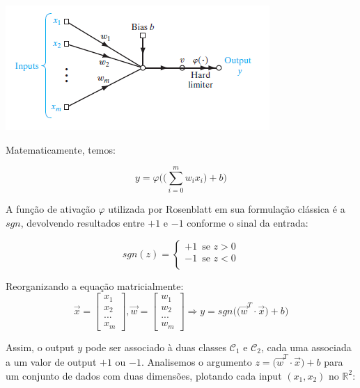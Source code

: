 \documentclass[
	12pt,				%
	oneside,			%
	a4paper,			%
	english,			%
	french,				%
	spanish,			%
	brazil,				%
	]{abntex2}
\begin{document}
\begin{center}
	\includegraphics[scale=1]{rosenblattperceptron.png}
\end{center} 

Matematicamente, temos:

$$ y = \varphi\bigg(  \big(\sum_{i=0}^m w_ix_i\big) + b \bigg)$$

A função de ativação $\varphi$ utilizada por Rosenblatt em sua formulação clássica é a $sgn$, devolvendo resultados entre $+1$ e $-1$ conforme o sinal da entrada:

$$sgn(z) = \begin{cases}
+1 \enspace \text{se } z > 0 \\
-1 \enspace \text{se } z < 0 \\
\end{cases}$$

Reorganizando a equa\c{c}\~ao matricialmente:
$$ \vec{x} = \begin{bmatrix}
x_1 \\
x_2 \\
... \\
x_m
\end{bmatrix},
\vec{w} = \begin{bmatrix}
w_1 \\
w_2 \\
... \\
w_m
\end{bmatrix} \Rightarrow
y = sgn\bigg( \big(\vec{w}^T\cdot \vec{x}\big) + b \bigg)$$

Assim, o output $y$ pode ser associado à duas classes $\mathcal{C}_1$ e $\mathcal{C}_2$, cada uma associada a um valor de output $+1$ ou $-1$. Analisemos o argumento $z = \big(\vec{w}^T\cdot \vec{x}\big) + b$ para um conjunto de dados com duas dimens\~oes, plotando cada input $(x_1,x_2)$ no $\mathbb{R}^2$:
\end{document}
